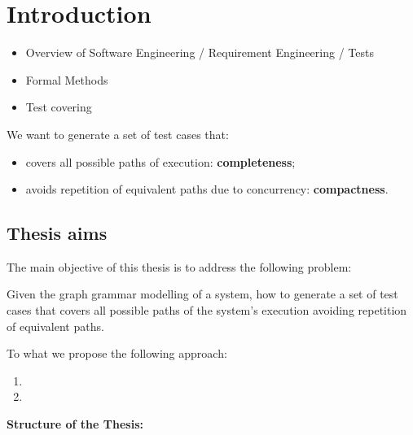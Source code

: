 \chapter{Introduction}

\begin{itemize}
  \item{Overview of Software Engineering / Requirement Engineering / Tests}

  \item {Formal Methods}

  \item {Test covering}
\end{itemize}



We want to generate a set of test cases that:

\begin{itemize}
  \item covers all possible paths of execution: \textbf{completeness};
  \item avoids repetition of equivalent paths due to concurrency: \textbf{compactness}.
\end{itemize}

\section{Thesis aims}

The main objective of this thesis is to address the following problem:

\begin{intuition}
  Given the graph grammar modelling of a system, how to generate a set of test cases that covers all possible paths of the system's execution avoiding repetition of equivalent paths.
\end{intuition}

To what we propose the following approach:

\begin{enumerate}
  \item
  \item
\end{enumerate}

\hfill \break
\textbf{Structure of the Thesis:}

